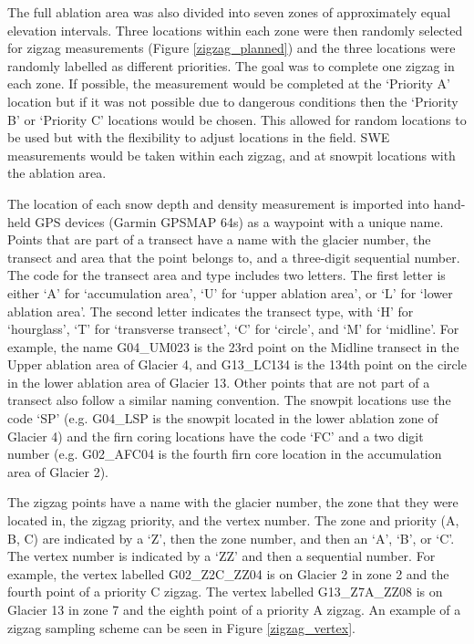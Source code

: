 \documentclass{sfuthesis}
\begin{document}
The full ablation area was also divided into seven zones of approximately equal elevation intervals. Three locations within each zone were then randomly selected for zigzag \citep{Shea2010} measurements (Figure \ref{zigzag_planned}) and the three locations were randomly labelled as different priorities. The goal was to complete one zigzag in each zone. If possible, the measurement would be completed at the `Priority A' location but if it was not possible due to dangerous conditions then the `Priority B' or `Priority C' locations would be chosen. This allowed for random locations to be used but with the flexibility to adjust locations in the field. SWE measurements would be taken within each zigzag, and at snowpit locations with the ablation area.  

The location of each snow depth and density measurement is imported into hand-held GPS devices (Garmin GPSMAP 64s) as a waypoint with a unique name. Points that are part of a transect have a name with the glacier number, the transect and area that the point belongs to, and a three-digit sequential number. The code for the transect area and type includes two letters. The first letter is either `A' for `accumulation area', `U' for `upper ablation area', or `L' for `lower ablation area'. The second letter indicates the transect type, with `H' for `hourglass', `T' for `transverse transect', `C' for `circle', and `M' for `midline'. For example, the name G04\_UM023 is the 23rd point on the Midline transect in the Upper ablation area of Glacier 4, and G13\_LC134 is the 134th point on the circle in the lower ablation area of Glacier 13. Other points that are not part of a transect also follow a similar naming convention. The snowpit locations use the code `SP' (e.g. G04\_LSP is the snowpit located in the lower ablation zone of Glacier 4) and the firn coring locations have the code `FC' and a two digit number (e.g. G02\_AFC04 is the fourth firn core location in the accumulation area of Glacier 2).

The zigzag points have a name with the glacier number, the zone that they were located in, the zigzag priority, and the vertex number. The zone and priority (A, B, C) are indicated by a `Z', then the zone number, and then an `A', `B', or `C'. The vertex number is indicated by a `ZZ' and then a sequential number. For example, the vertex labelled G02\_Z2C\_ZZ04 is on Glacier 2 in zone 2 and the fourth point of a priority C zigzag. The vertex labelled G13\_Z7A\_ZZ08 is on Glacier 13 in zone 7 and the eighth point of a priority A zigzag. An example of a zigzag sampling scheme can be seen in Figure \ref{zigzag_vertex}.
\end{document}
